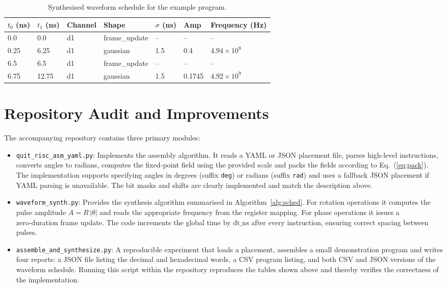 \documentclass[11pt]{article}
\begin{document}
\begin{table}[H]
\centering
\caption{Synthesised waveform schedule for the example program.
\label{tab:schedule}}
\begin{tabular}{@{}lllllll@{}}
\toprule
$t_0$ (ns) & $t_1$ (ns) & Channel & Shape & $\sigma$ (ns) & Amp & Frequency (Hz)\\
\midrule
0.0 & 0.0 & d1 & frame\_update & – & – & –\\
0.25 & 6.25 & d1 & gaussian & 1.5 & 0.4 & $4.94\times10^9$\\
6.5 & 6.5 & d1 & frame\_update & – & – & –\\
6.75 & 12.75 & d1 & gaussian & 1.5 & 0.1745 & $4.92\times10^9$\\
\bottomrule
\end{tabular}
\end{table}

\section{Repository Audit and Improvements}
The accompanying repository contains three primary modules:
\begin{itemize}
  \item \texttt{quit\_risc\_asm\_yaml.py}: Implements the assembly
    algorithm.  It reads a YAML or JSON placement file, parses
    high‑level instructions, converts angles to radians, computes the
    fixed‑point field using the provided scale and packs the fields
    according to Eq.~(\ref{eq:pack}).  The implementation supports
    specifying angles in degrees (suffix \texttt{deg}) or radians
    (suffix \texttt{rad}) and uses a fallback JSON placement if YAML
    parsing is unavailable.  The bit masks and shifts are clearly
    implemented and match the description above.
  \item \texttt{waveform\_synth.py}: Provides the synthesis algorithm
    summarised in Algorithm~\ref{alg:sched}.  For rotation operations it
    computes the pulse amplitude $A=R\,|\theta|$ and reads the
    appropriate frequency from the register mapping.  For phase
    operations it issues a zero‑duration frame update.  The code
    increments the global time by $\mathrm{dt\_ns}$ after every
    instruction, ensuring correct spacing between pulses.
  \item \texttt{assemble\_and\_synthesize.py}: A reproducible experiment
    that loads a placement, assembles a small demonstration program
    and writes four reports: a JSON file listing the decimal and
    hexadecimal words, a CSV program listing, and both CSV and JSON
    versions of the waveform schedule.  Running this script within the
    repository reproduces the tables shown above and thereby verifies
    the correctness of the implementation.
\end{itemize}
\end{document}
